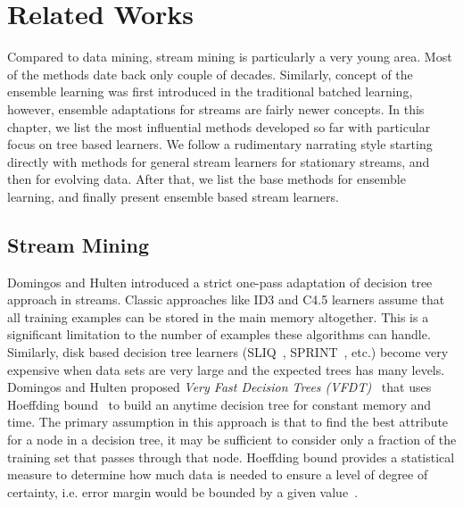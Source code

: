 \section{Related Works}
\label{chp:relworks}
Compared to data mining, stream mining is particularly a very young area. Most of the methods date back only couple of decades. Similarly, concept of the ensemble learning was first introduced in the traditional batched learning, however, ensemble adaptations for streams are fairly newer concepts. In this chapter, we list the most influential methods developed so far with particular focus on tree based learners. We follow a rudimentary narrating style starting directly with methods for general stream learners for stationary streams, and then for evolving data. After that, we list the base methods for ensemble learning, and finally present ensemble based stream learners.

\subsection{Stream Mining}

Domingos and Hulten introduced a strict one-pass adaptation of decision tree~\cite{breiman84:dt,quinlan93:c45} approach in streams. Classic approaches like ID3 and C4.5 learners assume that all training examples can be stored in the main memory altogether. This is a significant limitation to the number of examples these algorithms can handle. Similarly, disk based decision tree learners (SLIQ~\cite{mehta96:sliq}, SPRINT~\cite{shafer96:sprint}, etc.) become very expensive when data sets are very large and the expected trees has many levels. Domingos and Hulten proposed \textit{Very Fast Decision Trees (VFDT)}~\cite{domingos00:vfdt} that uses Hoeffding bound~\cite{hoeffding63:bound} to build an anytime decision tree for constant memory and time. The primary assumption in this approach is that to find the best attribute for a node in a decision tree, it may be sufficient to consider only a fraction of the training set that passes through that node. Hoeffding bound provides a statistical measure to determine how much data is needed to ensure a level of degree of certainty, i.e. error margin would be bounded by a given value~\cite{catlett91:thesis}.


